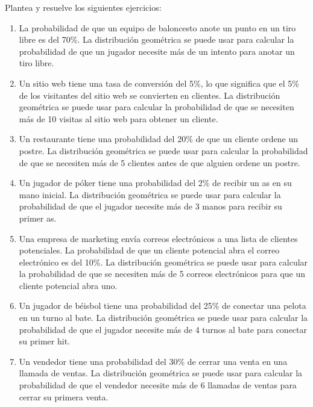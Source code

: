\begin{Ejer}
Plantea y resuelve los siguientes ejercicios:

\begin{enumerate}
    \item La probabilidad de que un equipo de baloncesto anote un punto en un tiro libre es del 70\%. La distribución geométrica se puede usar para calcular la probabilidad de que un jugador necesite más de un intento para anotar un tiro libre.

    \item Un sitio web tiene una tasa de conversión del 5\%, lo que significa que el 5\% de los visitantes del sitio web se convierten en clientes. La distribución geométrica se puede usar para calcular la probabilidad de que se necesiten más de 10 visitas al sitio web para obtener un cliente.

    \item Un restaurante tiene una probabilidad del 20\% de que un cliente ordene un postre. La distribución geométrica se puede usar para calcular la probabilidad de que se necesiten más de 5 clientes antes de que alguien ordene un postre.

    \item Un jugador de póker tiene una probabilidad del 2\% de recibir un as en su mano inicial. La distribución geométrica se puede usar para calcular la probabilidad de que el jugador necesite más de 3 manos para recibir su primer as.

    \item Una empresa de marketing envía correos electrónicos a una lista de clientes potenciales. La probabilidad de que un cliente potencial abra el correo electrónico es del 10\%. La distribución geométrica se puede usar para calcular la probabilidad de que se necesiten más de 5 correos electrónicos para que un cliente potencial abra uno.

    \item Un jugador de béisbol tiene una probabilidad del 25\% de conectar una pelota en un turno al bate. La distribución geométrica se puede usar para calcular la probabilidad de que el jugador necesite más de 4 turnos al bate para conectar su primer hit.

    \item Un vendedor tiene una probabilidad del 30\% de cerrar una venta en una llamada de ventas. La distribución geométrica se puede usar para calcular la probabilidad de que el vendedor necesite más de 6 llamadas de ventas para cerrar su primera venta.


\end{enumerate}
\end{Ejer}
